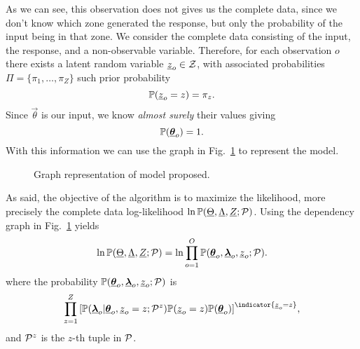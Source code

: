 \documentclass{ifacconf}  %
\begin{document}
As we can see, this observation does not gives us the complete data, since we don't know which zone generated the response, but only the probability of the input being in that zone.
We consider the complete data consisting of the input, the response, and a non-observable variable. Therefore, for each observation $o$ there exists a latent random variable ${\underline{z}_{o}\in\mathcal{Z}}$, with associated probabilities ${\Pi=\{\pi_{1},\dots,\pi_{Z}\}}$ such prior probability
   \begin{equation}
     \label{eq:prob_zo_equal_z}
\mathbb{P}(\underline{z}_{o}=z)=\pi_{z}.
\end{equation}
Since $\vec{\theta}$ is our input, we know \emph{almost surely} their values giving
\begin{equation}
  \label{eq:theta_almost_surely}
  \mathbb{P}({\underline{\boldsymbol{\theta}}}_{o})=1.
\end{equation}
With this information we can use the graph in Fig.~\ref{fig:model} to represent the model.
\begin{figure}[b]
  \centering
  \caption{Graph representation of model proposed.}\label{fig:model}
\end{figure}

As said, the objective of the \EM{} algorithm is to maximize the likelihood, more precisely the complete data log-likelihood $\ln\mathbb{P}(\underline{\Theta},\underline{\Lambda},\underline{Z};\mathcal{P})$.
Using the dependency graph in Fig.~\ref{fig:model} yields
    \begin{equation}\label{eq:completedataLogLikelihood}
      \ln\mathbb{P}(\underline{\Theta},\underline{\Lambda},\underline{Z};\mathcal{P})=\ln \prod_{o=1}^{O}\mathbb{P}({\underline{\boldsymbol{\theta}}}_{o},{\underline{\boldsymbol{\lambda}}}_{o},\underline{z}_{o};\mathcal{P}) .
    \end{equation}
where the probability $\mathbb{P}({\underline{\boldsymbol{\theta}}}_{o},{\underline{\boldsymbol{\lambda}}}_{o},\underline{z}_{o};\mathcal{P})$ is
\begin{equation}\label{eq:condional}
 \prod_{z=1}^{Z}{[\probability{\randomvec{\lambda}_{o}|\randomvec{\theta}_{o},\random{z}_{o}=z;\set{P}^{z}}\probability{\random{z}_{o}=z}\probability{\randomvec{\theta}_{o}}]}^{\indicator{\random{z}_{o}=z}},
\end{equation}
and $\mathcal{P}^{z}$ is the $z$-th tuple in $\mathcal{P}$.
\end{document}
